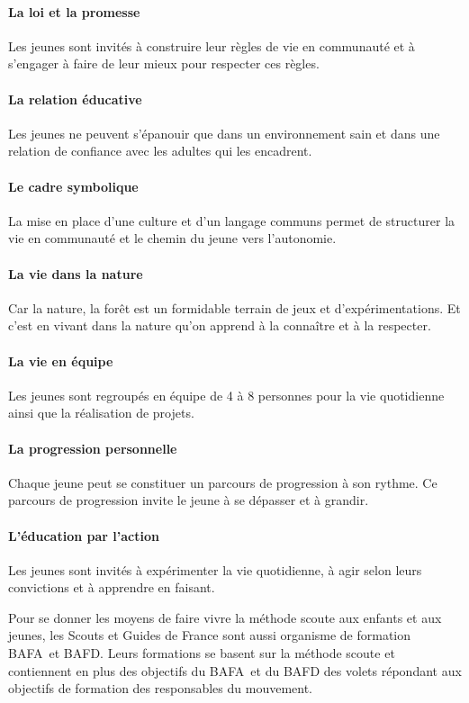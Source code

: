 \documentclass[titlepage,11pt,a4paper]{article}
\begin{document}
\paragraph{La loi et la promesse} Les jeunes sont invités à construire leur règles de vie
en communauté et à s'engager à faire de leur mieux pour respecter ces règles.

\paragraph{La relation éducative} Les jeunes ne peuvent s'épanouir que dans un
environnement sain et dans une relation de confiance avec les adultes qui les encadrent.

\paragraph{Le cadre symbolique} La mise en place d'une culture et d'un langage communs
permet de structurer la vie en communauté et le chemin du jeune vers l'autonomie.

\paragraph{La vie dans la nature} Car la nature, la forêt est un formidable terrain de jeux
et d'expérimentations. Et c'est en vivant dans la nature qu'on apprend à la connaître et à
la respecter.

\paragraph{La vie en équipe} Les jeunes sont regroupés en équipe de 4 à 8 personnes pour
la vie quotidienne ainsi que la réalisation de projets.

\paragraph{La progression personnelle} Chaque jeune peut se constituer un parcours
de progression à son rythme. Ce parcours de progression invite le jeune à se dépasser et à
grandir.

\paragraph{L'éducation par l'action} Les jeunes sont invités à expérimenter la vie
quotidienne, à agir selon leurs convictions et à apprendre en faisant.

Pour se donner les moyens de faire vivre la méthode scoute aux enfants et aux jeunes, les
Scouts et Guides de France sont aussi organisme de formation BAFA et BAFD\@. Leurs
formations se basent sur la méthode scoute et contiennent en plus des objectifs du BAFA et
du BAFD des volets répondant aux objectifs de formation des responsables du mouvement.
\end{document}
